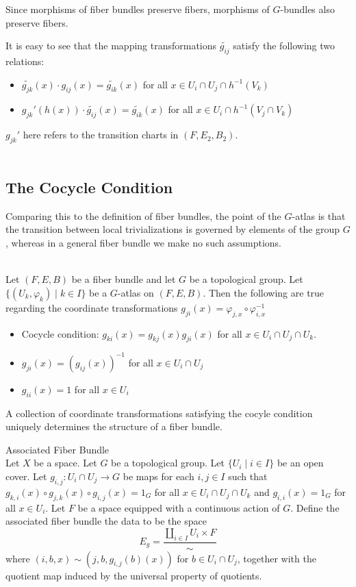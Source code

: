 \documentclass[a4paper]{article}
\begin{document}
Since morphisms of fiber bundles preserve fibers, morphisms of $G$-bundles also preserve fibers. 

It is easy to see that the mapping transformations $\widetilde{g_{ij}}$ satisfy the following two relations: 
\begin{itemize}
\item $\widetilde{g_{jk}}(x)\cdot g_{ij}(x)=\widetilde{g_{ik}}(x)$ for all $x\in U_i\cap U_j\cap h^{-1}(V_k)$
\item $g_{jk}'(h(x))\cdot\widetilde{g_{ij}}(x)=\widetilde{g_{ik}}(x)$ for all $x\in U_i\cap h^{-1}(V_j\cap V_k)$
\end{itemize}

$g_{jk}'$ here refers to the transition charts in $(F,E_2,B_2)$. \\~\\

\subsection{The Cocycle Condition}
Comparing this to the definition of fiber bundles, the point of the $G$-atlas is that the transition between local trivializations is governed by elements of the group $G$, whereas in a general fiber bundle we make no such assumptions. 

\begin{lmm}{}{}\\
Let $(F,E,B)$ be a fiber bundle and let $G$ be a topological group. Let $\{(U_k,\varphi_k)\;|\;k\in I\}$ be a $G$-atlas on $(F,E,B)$. Then the following are true regarding the coordinate transformations $g_{ji}(x)=\varphi_{j,x}\circ\varphi_{i,x}^{-1}$
\begin{itemize}
\item Cocycle condition: $g_{ki}(x)=g_{kj}(x)g_{ji}(x)$ for all $x\in U_i\cap U_j\cap U_k$. 
\item $g_{ji}(x)=(g_{ij}(x))^{-1}$ for all $x\in U_i\cap U_j$
\item $g_{ii}(x)=1$ for all $x\in U_i$
\end{itemize}
\end{lmm}

A collection of coordinate transformations satisfying the cocyle condition uniquely determines the structure of a fiber bundle. 

\begin{defn}{Associated Fiber Bundle}{}\\
Let $X$ be a space. Let $G$ be a topological group. Let $\{U_i\;|\;i\in I\}$ be an open cover. Let $g_{i,j}:U_i\cap U_j\to G$ be maps for each $i,j\in I$ such that $g_{k,i}(x)\circ g_{j,k}(x)\circ g_{i,j}(x)=1_G$ for all $x\in U_i\cap U_j\cap U_k$ and $g_{i,i}(x)=1_G$ for all $x\in U_i$. Let $F$ be a space equipped with a continuous action of $G$. Define the associated fiber bundle the data to be the space $$E_g=\frac{\coprod_{i\in I}U_i\times F}{\sim}$$ where $(i,b,x)\sim(j,b,g_{i,j}(b)(x))$ for $b\in U_i\cap U_j$, together with the quotient map induced by the universal property of quotients. 
\end{defn}
\end{document}
